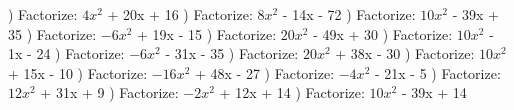 \documentclass{article}%
\begin{document}
\newline%
) Factorize: $4x^2$ + 20x + 16%
\newline%
\newline%
) Factorize: $8x^2$ - 14x - 72%
\newline%
\newline%
) Factorize: $10x^2$ - 39x + 35%
\newline%
\newline%
) Factorize: $-6x^2$ + 19x - 15%
\newline%
\newline%
) Factorize: $20x^2$ - 49x + 30%
\newline%
\newline%
) Factorize: $10x^2$ - 1x - 24%
\newline%
\newline%
) Factorize: $-6x^2$ - 31x - 35%
\newline%
\newline%
) Factorize: $20x^2$ + 38x - 30%
\newline%
\newline%
) Factorize: $10x^2$ + 15x - 10%
\newline%
\newline%
) Factorize: $-16x^2$ + 48x - 27%
\newline%
\newline%
) Factorize: $-4x^2$ - 21x - 5%
\newline%
\newline%
) Factorize: $12x^2$ + 31x + 9%
\newline%
\newline%
) Factorize: $-2x^2$ + 12x + 14%
\newline%
\newline%
) Factorize: $10x^2$ - 39x + 14%
\newline%
\newline%
\end{document}
